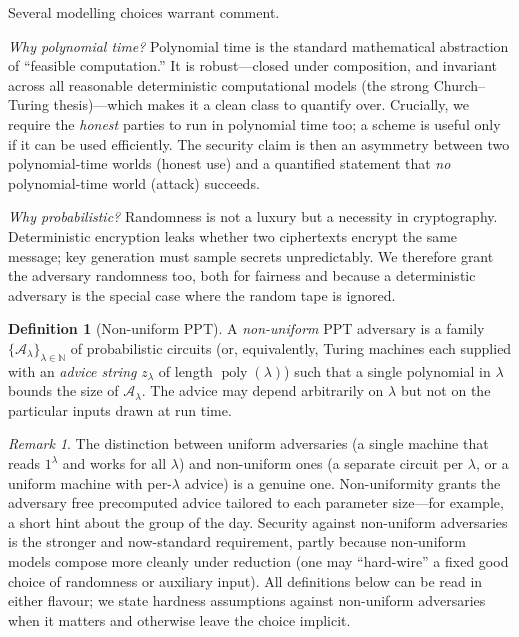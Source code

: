 \documentclass[11pt,a4paper]{article}
\theoremstyle{definition}
\newtheorem{definition}[theorem]{Definition}
\theoremstyle{remark}
\newtheorem{remark}[theorem]{Remark}
\newcommand{\N}{\ensuremath{\mathbb{N}}}
\DeclareMathOperator{\poly}{poly}
\begin{document}
Several modelling choices warrant comment.

\emph{Why polynomial time?} Polynomial time is the standard mathematical
abstraction of ``feasible computation.'' It is robust---closed under
composition, and invariant across all reasonable deterministic computational
models (the strong Church--Turing thesis)---which makes it a clean class to
quantify over. Crucially, we require the \emph{honest} parties to run in
polynomial time too; a scheme is useful only if it can be used efficiently. The
security claim is then an asymmetry between two polynomial-time worlds (honest
use) and a quantified statement that \emph{no} polynomial-time world (attack)
succeeds.

\emph{Why probabilistic?} Randomness is not a luxury but a necessity in
cryptography. Deterministic encryption leaks whether two ciphertexts encrypt the
same message; key generation must sample secrets unpredictably. We therefore grant
the adversary randomness too, both for fairness and because a deterministic
adversary is the special case where the random tape is ignored.

\begin{definition}[Non-uniform PPT]\label{model:def:nonuniform}
A \emph{non-uniform} PPT adversary is a family
\(\{\mathcal{A}_\lambda\}_{\lambda\in\N}\) of probabilistic circuits (or,
equivalently, Turing machines each supplied with an \emph{advice string}
\(z_\lambda\) of length \(\poly(\lambda)\)) such that a single polynomial in
\(\lambda\) bounds the size of \(\mathcal{A}_\lambda\). The
advice may depend arbitrarily on \(\lambda\) but not on the particular inputs
drawn at run time.
\end{definition}

\begin{remark}\label{model:rem:uniform-vs-nonuniform}
The distinction between uniform adversaries (a single machine that reads
\(1^\lambda\) and works for all \(\lambda\)) and non-uniform ones (a separate
circuit per \(\lambda\), or a uniform machine with per-\(\lambda\) advice) is a
genuine one. Non-uniformity grants the adversary free precomputed advice tailored
to each parameter size---for example, a short hint about the group of the day.
Security against non-uniform adversaries is the stronger and now-standard
requirement, partly because non-uniform models compose more cleanly under
reduction (one may ``hard-wire'' a fixed good choice of randomness or auxiliary
input). All definitions below can be read in either flavour; we state hardness
assumptions against non-uniform adversaries when it matters and
otherwise leave the choice implicit.
\end{remark}
\end{document}
